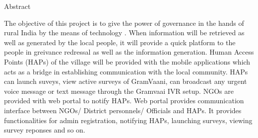 \begin{center}
\LARGE{Abstract}
\end{center}

\vspace{0.5in}

The objective of this project is to give the power of governance in the hands of rural India by the means of technology \cite{ict2}. When information will be retrieved as well as generated by the local people, it will provide a quick platform to the people in greivance redressal as well as the information generation. Human Access Points (HAPs) of the village will be provided with the mobile applications \cite{design} which acts as a bridge in establishing communication with the local community. HAPs can launch suveys, view active surveys of GramVaani, can broadcast any urgent voice message or text message through the Gramvaai IVR setup. NGOs are provided with web portal to notify HAPs. Web portal provides communication interface between NGOs/ District personnels/ Officials and HAPs. It provides functionalities for admin registration, notifying HAPs, launching surveys, viewing survey reponses and so on.